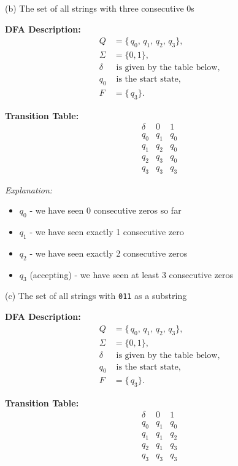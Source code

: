 \documentclass{article}
\theoremstyle{theorem}
\theoremstyle{definition}
\theoremstyle{remark}
\begin{document}
\bigskip

{(b) The set of all strings with three consecutive 0s}

\noindent
\textbf{DFA Description:}
\[
\begin{aligned}
Q &= \{\,q_0,\, q_1,\, q_2,\, q_3\},\\
\Sigma &= \{0,1\},\\
\delta &\text{ is given by the table below},\\
q_0 &\text{ is the start state},\\
F &= \{\,q_3\}.
\end{aligned}
\]

\noindent
\textbf{Transition Table:}
\[
\begin{array}{c|cc}
  \delta & 0 & 1 \\
\hline
  q_0    & q_1 & q_0 \\
  q_1    & q_2 & q_0 \\
  q_2    & q_3 & q_0 \\
  q_3    & q_3 & q_3
\end{array}
\]

\noindent
\textit{Explanation:}
\begin{itemize}
\item $q_0$ - we have seen 0 consecutive zeros so far
\item $q_1$ - we have seen exactly 1 consecutive zero
\item $q_2$ - we have seen exactly 2 consecutive zeros
\item $q_3$ (accepting) - we have seen at least 3 consecutive zeros
\end{itemize}

\bigskip

{(c) The set of all strings with \texttt{011} as a substring}

\noindent
\textbf{DFA Description:}
\[
\begin{aligned}
Q &= \{\,q_0,\, q_1,\, q_2,\, q_3\},\\
\Sigma &= \{0,1\},\\
\delta &\text{ is given by the table below},\\
q_0 &\text{ is the start state},\\
F &= \{\,q_3\}.
\end{aligned}
\]

\noindent
\textbf{Transition Table:}
\[
\begin{array}{c|cc}
  \delta & 0 & 1 \\
\hline
  q_0    & q_1 & q_0 \\
  q_1    & q_1 & q_2 \\
  q_2    & q_1 & q_3 \\
  q_3    & q_3 & q_3
\end{array}
\]
\end{document}
